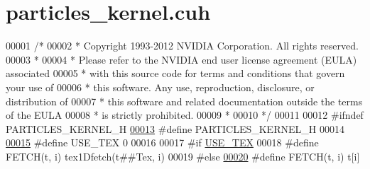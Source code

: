 \hypertarget{particles__kernel_8cuh_source}{\section{particles\-\_\-kernel.\-cuh}
}

\begin{DoxyCode}
00001 \textcolor{comment}{/*}
00002 \textcolor{comment}{ * Copyright 1993-2012 NVIDIA Corporation.  All rights reserved.}
00003 \textcolor{comment}{ *}
00004 \textcolor{comment}{ * Please refer to the NVIDIA end user license agreement (EULA) associated}
00005 \textcolor{comment}{ * with this source code for terms and conditions that govern your use of}
00006 \textcolor{comment}{ * this software. Any use, reproduction, disclosure, or distribution of}
00007 \textcolor{comment}{ * this software and related documentation outside the terms of the EULA}
00008 \textcolor{comment}{ * is strictly prohibited.}
00009 \textcolor{comment}{ *}
00010 \textcolor{comment}{ */}
00011 
00012 \textcolor{preprocessor}{#}\textcolor{preprocessor}{ifndef} \textcolor{preprocessor}{PARTICLES\_KERNEL\_H}
\hypertarget{particles__kernel_8cuh_source_l00013}{}\hyperlink{particles__kernel_8cuh_a384444f066551f04f65ff94b99aa7091}{00013} \textcolor{preprocessor}{#}\textcolor{preprocessor}{define} \textcolor{preprocessor}{PARTICLES\_KERNEL\_H}
00014 
\hypertarget{particles__kernel_8cuh_source_l00015}{}\hyperlink{particles__kernel_8cuh_a0ab211ca35e2616c721fcf2dd4f99c83}{00015} \textcolor{preprocessor}{#}\textcolor{preprocessor}{define} \textcolor{preprocessor}{USE\_TEX} 0
00016 
00017 \textcolor{preprocessor}{#}\textcolor{preprocessor}{if} \hyperlink{particles__kernel_8cuh_a0ab211ca35e2616c721fcf2dd4f99c83}{USE\_TEX}
00018 \textcolor{preprocessor}{#}\textcolor{preprocessor}{define} \textcolor{preprocessor}{FETCH}\textcolor{preprocessor}{(}\textcolor{preprocessor}{t}\textcolor{preprocessor}{,} \textcolor{preprocessor}{i}\textcolor{preprocessor}{)} \textcolor{preprocessor}{tex1Dfetch}\textcolor{preprocessor}{(}\textcolor{preprocessor}{t}\textcolor{preprocessor}{##}\textcolor{preprocessor}{Tex}\textcolor{preprocessor}{,} \textcolor{preprocessor}{i}\textcolor{preprocessor}{)}
00019 \textcolor{preprocessor}{#}\textcolor{preprocessor}{else}
\hypertarget{particles__kernel_8cuh_source_l00020}{}\hyperlink{particles__kernel_8cuh_a12269d678a65f18889c2a7e98c756457}{00020} \textcolor{preprocessor}{#}\textcolor{preprocessor}{define} \textcolor{preprocessor}{FETCH}\textcolor{preprocessor}{(}\textcolor{preprocessor}{t}\textcolor{preprocessor}{,} \textcolor{preprocessor}{i}\textcolor{preprocessor}{)} \textcolor{preprocessor}{t}\textcolor{preprocessor}{[}\textcolor{preprocessor}{i}\textcolor{preprocessor}{]}

\end{DoxyCode}
